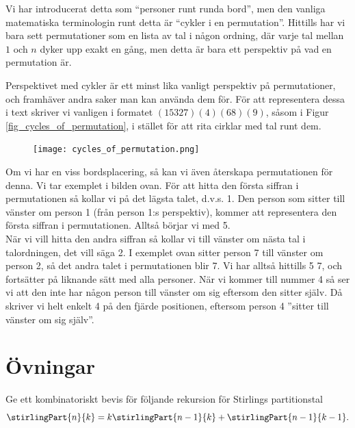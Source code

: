 \documentclass[nobib]{tufte-handout}
\begin{document}
\begin{remark}
  Vi har introducerat detta som ``personer runt runda bord'', men den vanliga matematiska terminologin runt detta är ``cykler i en permutation''. Hittills har vi bara sett permutationer som en lista av tal i någon ordning, där varje tal mellan $1$ och $n$ dyker upp exakt en gång, men detta är bara ett perspektiv på vad en permutation är.

  Perspektivet med cykler är ett minst lika vanligt perspektiv på permutationer, och framhäver andra saker man kan använda dem för. För att representera dessa i text skriver vi vanligen i formatet $(15327)(4)(68)(9)$, såsom i Figur \ref{fig_cycles_of_permutation}, i stället för att rita cirklar med tal runt dem.
\end{remark}

\begin{remark}
    \begin{figure}[h]
\texttt{[image: cycles\_of\_permutation.png]}
\end{figure}
Om vi har en viss bordsplacering, så kan vi även återskapa permutationen för denna. Vi tar exemplet i bilden ovan. För att hitta den första siffran i permutationen så kollar vi på det lägsta talet, d.v.s. 1. Den person som sitter till vänster om person 1 (från person 1:s perspektiv), kommer att representera den första siffran i permutationen. Alltså börjar vi med 5.\\
När vi vill hitta den andra siffran så kollar vi till vänster om nästa tal i talordningen, det vill säga 2. I exemplet ovan sitter person 7 till vänster om person 2, så det andra talet i permutationen blir 7. Vi har alltså hittills 5 7, och fortsätter på liknande sätt med alla personer. När vi kommer till nummer 4 så ser vi att den inte har någon person till vänster om sig eftersom den sitter själv. Då skriver vi helt enkelt 4 på den fjärde positionen, eftersom person 4 ''sitter till vänster om sig själv''.
\end{remark}

\section{Övningar}

\begin{xca}
  Ge ett kombinatoriskt bevis för följande rekursion för Stirlings partitionstal
  $$\stirlingPart{n}{k} = k\stirlingPart{n-1}{k} + \stirlingPart{n-1}{k-1}.$$
\end{xca}
\end{document}
